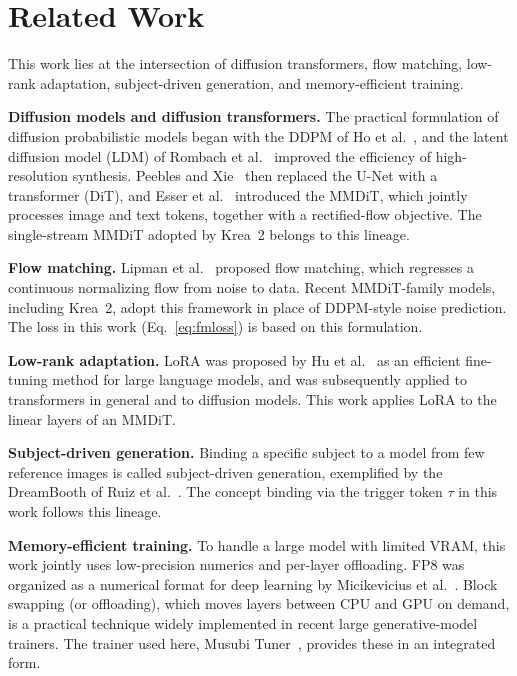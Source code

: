 \documentclass[10pt,twocolumn]{article}
\begin{document}
\section{Related Work}
This work lies at the intersection of diffusion transformers, flow matching, low-rank adaptation, subject-driven generation, and memory-efficient training.

\textbf{Diffusion models and diffusion transformers.} The practical formulation of diffusion probabilistic models began with the DDPM of Ho et al.~\cite{ho2020ddpm}, and the latent diffusion model (LDM) of Rombach et al.~\cite{rombach2022ldm} improved the efficiency of high-resolution synthesis. Peebles and Xie~\cite{peebles2023dit} then replaced the U-Net with a transformer (DiT), and Esser et al.~\cite{esser2024sd3} introduced the MMDiT, which jointly processes image and text tokens, together with a rectified-flow objective. The single-stream MMDiT adopted by Krea~2 belongs to this lineage.

\textbf{Flow matching.} Lipman et al.~\cite{lipman2023flowmatching} proposed flow matching, which regresses a continuous normalizing flow from noise to data. Recent MMDiT-family models, including Krea~2, adopt this framework in place of DDPM-style noise prediction. The loss in this work (Eq.~\eqref{eq:fmloss}) is based on this formulation.

\textbf{Low-rank adaptation.} LoRA was proposed by Hu et al.~\cite{hu2022lora} as an efficient fine-tuning method for large language models, and was subsequently applied to transformers in general and to diffusion models. This work applies LoRA to the linear layers of an MMDiT.

\textbf{Subject-driven generation.} Binding a specific subject to a model from few reference images is called subject-driven generation, exemplified by the DreamBooth of Ruiz et al.~\cite{ruiz2023dreambooth}. The concept binding via the trigger token $\tau$ in this work follows this lineage.

\textbf{Memory-efficient training.} To handle a large model with limited VRAM, this work jointly uses low-precision numerics and per-layer offloading. FP8 was organized as a numerical format for deep learning by Micikevicius et al.~\cite{micikevicius2022fp8}. Block swapping (or offloading), which moves layers between CPU and GPU on demand, is a practical technique widely implemented in recent large generative-model trainers. The trainer used here, Musubi Tuner~\cite{musubi2026}, provides these in an integrated form.
\end{document}
